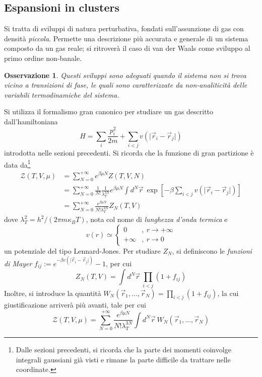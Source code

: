 \documentclass[11pt, a4paper]{scrartcl}
\theoremstyle{style}
\newtheorem{osservazione}{Osservazione}[section]
\theoremstyle{style1}
\numberwithin{equation}{subsection}
\begin{document}
\subsection{Espansioni in clusters}
Si tratta di sviluppi di natura perturbativa, fondati sull'assunzione di gas con densit\`a \textit{piccola}.
Permette una descrizione pi\`u accurata e generale di un sistema composto da un gas reale; si ritrover\`a il caso di van der Waals come sviluppo al primo ordine non-banale.
\begin{osservazione}
Questi sviluppi sono adeguati quando il sistema non si trova vicino a transizioni di fase, le quali sono caratterizzate da non-analiticit\`a delle variabili termodinamiche del sistema.
\end{osservazione}
\noindent Si utilizza il formalismo gran canonico per studiare un gas descritto dall'hamiltoniana
\[
H = \sum_{i}^{} \frac{p_i^2}{2m} + \sum_{i<j}^{} v\left(\lvert \vec{r}_i - \vec{r}_j \rvert \right) 
\] 
introdotta nelle sezioni precedenti. 
Si ricorda che la funzione di gran partizione \`e data da\footnote{Dalle sezioni precedenti, si ricorda che la parte dei momenti coinvolge integrali gaussiani gi\`a visti e rimane la parte difficile da trattare nelle coordinate.} 
\[
	\begin{split}
		\mathcal{Z} (T,V,\mu ) &= \sum_{N=0}^{+\infty}  e^{\beta \mu N} Z(T,V,N) \\
				       &= \sum_{N=0}^{+\infty} \frac{1}{N!} \frac{1}{\lambda _T^{3N} }e^{\beta \mu N}\int d^N \vec{r} \ \exp \left[ -\beta \sum_{i<j}^{} v\left(\lvert \vec{r}_i -\vec{r}_j \rvert \right)  \right] \\
				       &=\sum_{N=0}^{+\infty} \frac{e^{\beta \mu N} }{N! \lambda _T^{3N} } Z_N(T,V)
	\end{split}
\] 
dove $\lambda _T ^2 = h^2 / (2\pi m \kappa _B T)$, nota col nome di \textit{lunghezza d'onda termica} e 
\[
v(r)\simeq \begin{cases}
	0 &,\ r\to +\infty\\
	+\infty &,\ r\to 0
\end{cases}
\] 
un potenziale del tipo Lennard-Jones.
Per studiare $Z_N$, si definiscono le \textit{funzioni di Mayer} $f_{ij} := e^{-\beta v\left(\lvert \vec{r}_i - \vec{r}_j \rvert \right) } - 1$, per cui
\[
Z_N(T,V) = \int d^N \vec{r}\ \prod_{i<j} (1+f_{ij} )
\] 
Inoltre, si introduce la quantit\`a $W_N(\vec{r}_1,\ldots,\vec{r}_N)=\prod_{i<j} (1+f_{ij} )$, la cui giustificazione arriver\`a pi\`u avanti, tale per cui 
\begin{equation}\label{ncumexp}
\mathcal{Z} (T,V,\mu ) = \sum_{N=0}^{+\infty} \frac{e^{\beta \mu N}}{N!\lambda _T^{3N} } \int d^N \vec{r}\ W_N(\vec{r}_1,\ldots,\vec{r}_N)
\end{equation}
\end{document}
